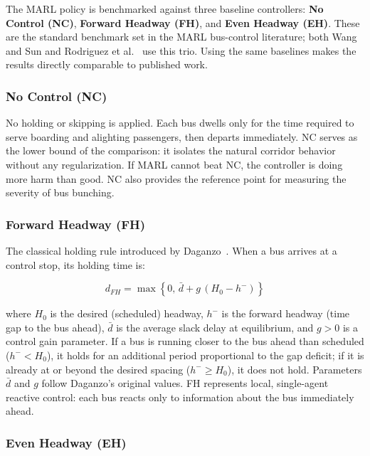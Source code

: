 The MARL policy is benchmarked against three baseline controllers: \textbf{No Control (NC)}, \textbf{Forward Headway (FH)}, and \textbf{Even Headway (EH)}. These are the standard benchmark set in the MARL bus-control literature; both Wang and Sun \cite{Wangsun} and Rodriguez et al.~\cite{Rodriguez2023Cooperative} use this trio. Using the same baselines makes the results directly comparable to published work.

\subsubsection{No Control (NC)}

No holding or skipping is applied. Each bus dwells only for the time required to serve boarding and alighting passengers, then departs immediately. NC serves as the lower bound of the comparison: it isolates the natural corridor behavior without any regularization. If MARL cannot beat NC, the controller is doing more harm than good. NC also provides the reference point for measuring the severity of bus bunching.
\clearpage

\subsubsection{Forward Headway (FH)}

The classical holding rule introduced by Daganzo~\cite{Daganzo2009}. When a bus arrives at a control stop, its holding time is:

\begin{equation}
d_{FH} = \max\!\left\{0,\, \bar{d} + g\,(H_0 - h^-)\right\}
\label{eq:fh}
\end{equation}

where $H_0$ is the desired (scheduled) headway, $h^-$ is the forward headway (time gap to the bus ahead), $\bar{d}$ is the average slack delay at equilibrium, and $g > 0$ is a control gain parameter. If a bus is running closer to the bus ahead than scheduled ($h^- < H_0$), it holds for an additional period proportional to the gap deficit; if it is already at or beyond the desired spacing ($h^- \geq H_0$), it does not hold. Parameters $\bar{d}$ and $g$ follow Daganzo's original values. FH represents local, single-agent reactive control: each bus reacts only to information about the bus immediately ahead.

\subsubsection{Even Headway (EH)}

